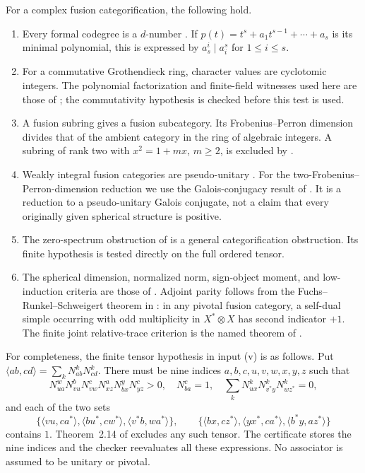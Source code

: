 \begin{proposition}\label{prop:inputs}
For a complex fusion categorification, the following hold.
\begin{enumerate}[label=(\roman*)]
\item Every formal codegree is a $d$-number \cite{Ocode}. If
$p(t)=t^s+a_1t^{s-1}+\cdots+a_s$ is its minimal polynomial, this is
expressed by $a_s^i\mid a_i^s$ for $1\le i\le s$.
\item For a commutative Grothendieck ring, character values are cyclotomic
integers. The polynomial factorization and finite-field witnesses used
here are those of \cite[Section~2]{DP4}; the commutativity hypothesis is
checked before this test is used.
\item A fusion subring gives a fusion subcategory. Its Frobenius--Perron
dimension divides that of the ambient category in the ring of algebraic
integers. A subring of rank two with $x^2=1+mx$, $m\ge2$, is excluded
by \cite{Ostrik2}.
\item Weakly integral fusion categories are pseudo-unitary
\cite{ENO}. For the two-Frobenius--Perron-dimension reduction we use the
Galois-conjugacy result of \cite[Lemma~3.1]{SchTwo}.
It is a reduction to a pseudo-unitary Galois conjugate, not a claim that
every originally given spherical structure is positive.
\item The zero-spectrum obstruction of \cite[Theorem~2.14]{LPR}
is a general categorification obstruction. Its finite hypothesis is
tested directly on the full ordered tensor.
\item The spherical dimension, normalized norm, sign-object moment,
and low-induction criteria are those of
\cite[Sections~2,3,6,7]{DP4}. Adjoint parity follows from the
Fuchs--Runkel--Schweigert theorem in
\cite[Theorem~3.9]{LPRV2025}: in any pivotal fusion category, a self-dual
simple occurring with odd multiplicity in $X^*\otimes X$ has second
indicator $+1$. The finite joint relative-trace criterion is the named theorem of
\cite{DP5}.
\end{enumerate}
\end{proposition}

For completeness, the finite tensor hypothesis in input (v) is as
follows. Put $\langle ab,cd\rangle=\sum_kN_{ab}^kN_{cd}^k$.
There must be nine indices $a,b,c,u,v,w,x,y,z$ such that
\[
 N_{ua}^{w}N_{vu}^{b}N_{vw}^{c}N_{xz}^{a}N_{bx}^{y}N_{yz}^{c}>0,
 \quad N_{ba}^{c}=1,
 \quad \sum_kN_{ux}^{k}N_{v^*y}^{k}N_{wz^*}^{k}=0,
\]
and each of the two sets
\[
 \{\langle vu,ca^*\rangle,\langle bu^*,cw^*\rangle,
       \langle v^*b,wa^*\rangle\},
 \qquad
 \{\langle bx,cz^*\rangle,\langle yx^*,ca^*\rangle,
       \langle b^*y,az^*\rangle\}
\]
contains $1$. Theorem~2.14 of \cite{LPR} excludes any such tensor.
The certificate stores the nine indices and the checker reevaluates all
these expressions. No associator is assumed to be unitary or pivotal.

